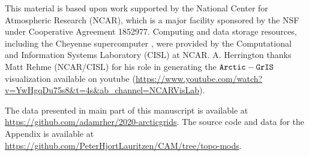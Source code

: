 \documentclass[draft]{agujournal2019}
\begin{document}
%
%
%
%
%
%
%
%


\acknowledgments
    This material is based upon work supported by the National Center for Atmospheric Research (NCAR), which is a major facility sponsored by the NSF under Cooperative Agreement 1852977. Computing and data storage resources, including the Cheyenne supercomputer \cite{cheyenne}, were provided by the Computational and Information Systems Laboratory (CISL) at NCAR. A. Herrington thanks Matt Rehme (NCAR/CISL) for his role in generating the $\tt Arctic-GrIS$ visualization available on youtube ({\url{https://www.youtube.com/watch?v=YwHgqDu75s8&t=4s&ab_channel=NCARVisLab}}).

The data presented in main part of this manuscript is available at {\url{https://github.com/adamrher/2020-arcticgrids}}. The source code and data for the Appendix is available at {\url{https://github.com/PeterHjortLauritzen/CAM/tree/topo-mods}}.


%
%

%



%
%
%
%
%
\end{document}
